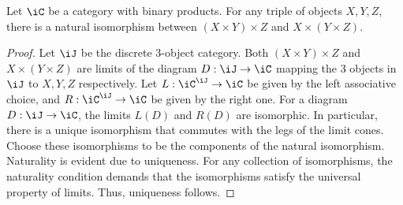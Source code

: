 \documentclass{amsart}
\begin{document}
\begin{eg}
  Let $\iC$ be a category with binary products.
  For any triple of objects $X, Y, Z$, there is a natural isomorphism between $(X \times Y) \times Z$ and $X \times (Y \times Z)$.
\end{eg}
\begin{proof}
  Let $\iJ$ be the discrete 3-object category.
  Both $(X \times Y) \times Z$ and $X \times (Y \times Z)$ are limits of the diagram $D : \iJ \to \iC$ mapping the 3 objects in $\iJ$ to $X, Y, Z$ respectively.
  Let $L : \iC^{\iJ} \to \iC$ be given by the left associative choice, and $R : \iC^{\iJ} \to \iC$ be given by the right one.
  For a diagram $D : \iJ \to \iC$, the limits $L(D)$ and $R(D)$ are isomorphic.
  In particular, there is a unique isomorphism that commutes with the legs of the limit cones.
  Choose these isomorphisms to be the components of the natural isomorphism.
  Naturality is evident due to uniqueness.
  For any collection of isomorphisms, the naturality condition demands that the isomorphisms satisfy the universal property of limits.
  Thus, uniqueness follows.
\end{proof}



\end{document}
